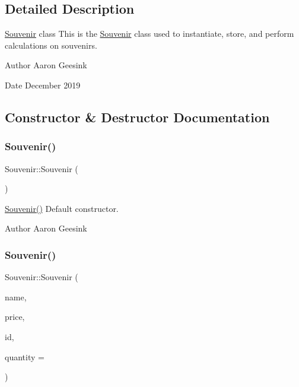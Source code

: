 \subsection{Detailed Description}
\mbox{\hyperlink{class_souvenir}{Souvenir}} class This is the \mbox{\hyperlink{class_souvenir}{Souvenir}} class used to instantiate, store, and perform calculations on souvenirs. 

\begin{DoxyAuthor}{Author}
Aaron Geesink 
\end{DoxyAuthor}
\begin{DoxyDate}{Date}
December 2019 
\end{DoxyDate}


\subsection{Constructor \& Destructor Documentation}
\mbox{\label{class_souvenir_a1c80e600047ec0e9cc064cf78c79b630}} 
\subsubsection{\texorpdfstring{Souvenir()}{Souvenir()}\hspace{0.1cm}{\footnotesize\ttfamily [1/4]}}
{\footnotesize\ttfamily Souvenir\+::\+Souvenir (\begin{DoxyParamCaption}{ }\end{DoxyParamCaption})}



\mbox{\hyperlink{class_souvenir_a1c80e600047ec0e9cc064cf78c79b630}{Souvenir()}} Default constructor. 

\begin{DoxyAuthor}{Author}
Aaron Geesink 
\end{DoxyAuthor}
\mbox{\label{class_souvenir_a608b5815a4039dc6141ececefb500c77}} 
\subsubsection{\texorpdfstring{Souvenir()}{Souvenir()}\hspace{0.1cm}{\footnotesize\ttfamily [2/4]}}
{\footnotesize\ttfamily Souvenir\+::\+Souvenir (\begin{DoxyParamCaption}\item[{Q\+String}]{name,  }\item[{double}]{price,  }\item[{int}]{id,  }\item[{int}]{quantity = {} }\end{DoxyParamCaption})}



